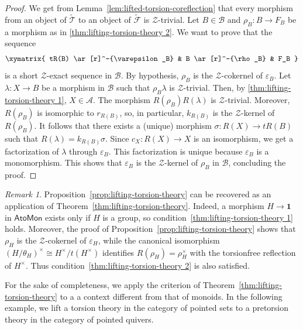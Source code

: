 \documentclass[a4paper,10pt,reqno]{amsart}
\theoremstyle{definition}
\theoremstyle{remark}
\newtheorem{remark}[theorem]{Remark}
\newcommand{\AtoMon}{\mathsf{AtoMon}}
\newcommand{\Cal}[1]{\mathcal{#1}}
\begin{document}
\begin{proof}
We get from Lemma~\ref{lem:lifted-torsion-coreflection} that every morphism from an object of $\widetilde{\Cal T}$ to an object of $\widetilde{\Cal F}$ is $\Cal Z$-trivial.
Let $B \in \Cal B$ and $\rho_B\colon B \to F_B$ be a morphism as in \ref{thm:lifting-torsion-theory 2}. We want to prove that the sequence
$$
\xymatrix{
tR(B) \ar[r]^-{\varepsilon_B} & B \ar[r]^-{\rho_B} & F_B
}
$$
is a short $\Cal Z$-exact sequence in $\Cal B$. By hypothesis, $\rho_B$ is the $\Cal Z$-cokernel of $\varepsilon_B$.
Let $\lambda\colon X \to B$ be a morphism in $\Cal B$ such that $\rho_B\lambda$ is $\Cal Z$-trivial. Then, by \ref{thm:lifting-torsion-theory 1}, $X \in \Cal A$. The morphism $R(\rho_B)R(\lambda)$ is $\Cal Z$-trivial. Moreover, $R(\rho_B)$ is isomorphic to $r_{R(B)}$, so, in particular, $k_{R(B)}$ is the $\Cal Z$-kernel of $R(\rho_B)$. It follows that there exists a (unique) morphism $\sigma \colon R(X)\to tR(B)$ such that $R(\lambda)=k_{R(B)}\sigma$. Since $c_X\colon R(X)\to X$ is an isomorphism, we get a factorization of $\lambda$ through $\varepsilon_B$. This factorization is unique because $\varepsilon_B$ is a monomorphism. This shows that $\varepsilon_B$ is the $\Cal Z$-kernel of $\rho_B$ in $\Cal B$, concluding the proof.
\end{proof}

\begin{remark} Proposition~\ref{prop:lifting-torsion-theory} can be recovered as an application of Theorem~\ref{thm:lifting-torsion-theory}. Indeed, a morphism $H\to\mathbf 1$ in $\AtoMon$ exists only if $H$ is a group, so condition~\ref{thm:lifting-torsion-theory 1} holds. Moreover, the proof of Proposition~\ref{prop:lifting-torsion-theory} shows that $\rho_H$ is the $\Cal Z$-cokernel of $\varepsilon_H$, while the canonical isomorphism
$(H/\theta_H)^\times\cong H^\times/t(H^\times)$ identifies $R(\rho_H)=\rho_H^\times$ with the torsionfree reflection of $H^\times$. Thus condition~\ref{thm:lifting-torsion-theory 2} is also satisfied.
\end{remark}

For the sake of completeness, we apply the criterion of Theorem~\ref{thm:lifting-torsion-theory} to a a context different from that of monoids. In the following example, we lift a torsion theory in the category of pointed sets to a pretorsion theory in the category of pointed quivers.
\end{document}
